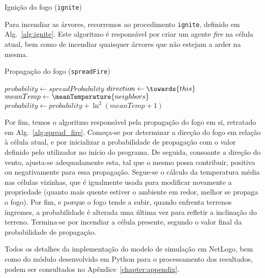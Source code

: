 \begin{algorithm}
    \caption{Ignição do fogo (\texttt{ignite})}\label{alg:ignite}
    \;
\end{algorithm}

Para incendiar as árvores, recorremos ao procedimento \texttt{ignite}, definido em Alg.~\ref{alg:ignite}. Este algoritmo é responsável por criar um agente \textit{fire} na célula atual, bem como de incendiar quaisquer árvores que não estejam a arder na mesma.


\begin{algorithm}
    \caption{Propagação do fogo (\texttt{spreadFire})}\label{alg:spread_fire}
    $probability \gets spreadProbability$\;
    $direction \gets \towards{this}$\;
    $meanTemp \gets \meanTemperature{neighbors}$\;
    $probability \gets probability + \ln^2{(meanTemp + 1)}$\;
\end{algorithm}

Por fim, temos o algoritmo responsável pela propagação do fogo em si, retratado em Alg.~\ref{alg:spread_fire}. Começa-se por determinar a direção do fogo em relação à célula atual, e por inicializar a probabilidade de propagação com o valor definido pelo utilizador no início do programa. De seguida, consoante a direção do vento, ajusta-se adequadamente esta, tal que o mesmo possa contribuir, positiva ou negativamente para essa propagação. Segue-se o cálculo da temperatura média nas células vizinhas, que é igualmente usada para modificar novamente a propriedade (quanto mais quente estiver o ambiente em redor, melhor se propaga o fogo). Por fim, e porque o fogo tende a subir, quando enfrenta terrenos íngremes, a probabilidade é alterada uma última vez para refletir a inclinação do terreno. Termina-se por incendiar a célula presente, segundo o valor final da probabilidade de propagação.

Todos os detalhes da implementação do modelo de simulação em NetLogo, bem como do módulo desenvolvido em Python para o processamento dos resultados, podem ser consultados no Apêndice~\ref{chapter:appendix}.